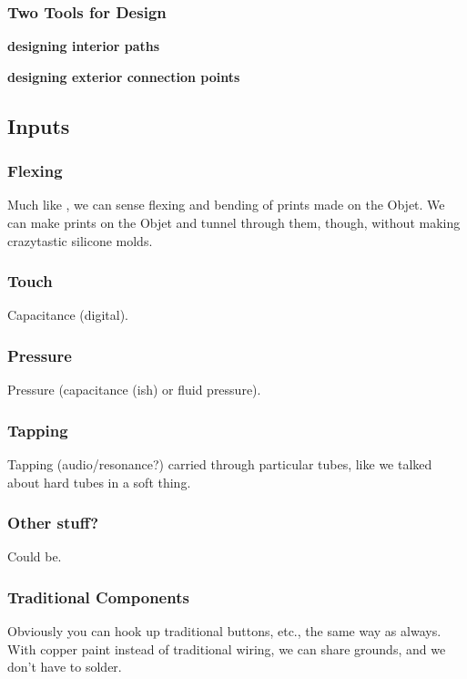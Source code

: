 \subsubsection{Two Tools for Design}

\textbf{designing interior paths}

\textbf{designing exterior connection points}

\subsection{Inputs}

\subsubsection{Flexing}

Much like \cite{Slyper-shape}, we can sense flexing and bending of prints made on the Objet.  We can make prints on the Objet and tunnel through them, though, without making crazytastic silicone molds.

\subsubsection{Touch}
Capacitance (digital).  

\subsubsection{Pressure}
Pressure (capacitance (ish) or fluid pressure). 

\subsubsection{Tapping}
 Tapping (audio/resonance?) carried through particular tubes, like we talked about hard tubes in a soft thing.

\subsubsection{Other stuff?}
Could be.

\subsubsection{Traditional Components}
Obviously you can hook up traditional buttons, etc., the same way as always.  With copper paint instead of traditional wiring, we can share grounds, and we don't have to solder.


